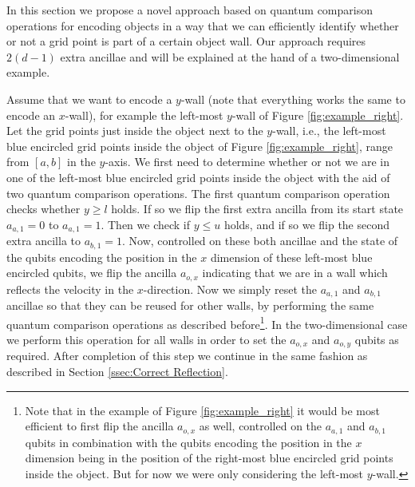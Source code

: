 In this section we propose a novel approach based on quantum comparison operations for encoding objects in a way that we can efficiently identify whether or not a grid point is part of a certain object wall. Our approach requires $2(d-1)$ extra ancillae and will be explained at the hand of a two-dimensional example.




Assume that we want to encode a $y$-wall (note that everything works the same to encode an $x$-wall), for example the left-most $y$-wall of Figure \ref{fig:example_right}. Let the grid points just inside the object next to the $y$-wall, i.e., the left-most blue encircled grid points inside the object of Figure \ref{fig:example_right}, range from $[ a,b ]$ in the $y$-axis. We first need to determine whether or not we are in one of the left-most blue encircled grid points inside the object with the aid of two quantum comparison operations. The first quantum comparison operation checks whether $y \geq l$ holds. If so we flip the first extra ancilla from its start state $a_{a,1}= 0$ to $a_{a,1}= 1$. Then we check if $y \leq u$ holds, and if so we flip the second extra ancilla to $a_{b,1}= 1$. Now, controlled on these both ancillae and the state of the qubits encoding the position in the $x$ dimension of these left-most blue encircled qubits, we flip the ancilla $a_{o,x}$ indicating that we are in a wall which reflects the velocity in the $x$-direction.
Now we simply reset the $a_{a,1}$ and $a_{b,1}$ ancillae so that they can be reused for other walls, by performing the same quantum comparison operations as described before\footnote{Note that in the example of Figure \ref{fig:example_right} it would be most efficient to first flip the ancilla $a_{o,x}$ as well, controlled on the $a_{a,1}$ and $a_{b,1}$ qubits in combination with the qubits encoding the position in the $x$ dimension being in the position of the right-most blue encircled grid points inside the object. But for now we were only considering the left-most $y$-wall.}.
In the two-dimensional case we perform this operation for all walls in order to set the $a_{o,x}$ and $a_{o,y}$ qubits as required. After completion of this step we continue in the same fashion as described in Section \ref{ssec:Correct Reflection}.

